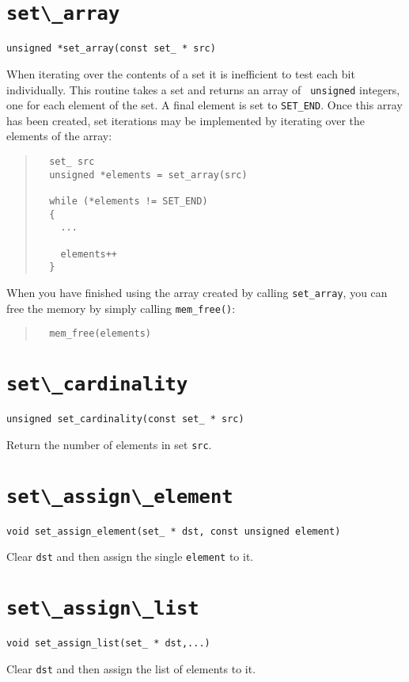 \section{\protect\verb+set\_array+}
\begin{verbatim}
unsigned *set_array(const set_ * src)
\end{verbatim}
When iterating over the contents of a set it is inefficient to test each
bit individually. This routine takes a set and returns an array of {\tt
unsigned} integers, one for each element of the set. A final element is
set to \verb+SET_END+. Once this array has been created, set iterations
may be implemented by iterating over the elements of the array:
\begin{quote}
\begin{verbatim}
  set_ src
  unsigned *elements = set_array(src)

  while (*elements != SET_END)
  {
    ...

    elements++
  }

\end{verbatim}
\end{quote}

When you have finished using the array created by calling
\verb+set_array+, you can free the memory by simply calling
\verb+mem_free()+:
\begin{quote}
\begin{verbatim}
  mem_free(elements)
\end{verbatim}
\end{quote}

\section{\protect\verb+set\_cardinality+}
\begin{verbatim}
unsigned set_cardinality(const set_ * src)
\end{verbatim}
Return the number of elements in set {\tt src}.

\section{\protect\verb+set\_assign\_element+}
\begin{verbatim}
void set_assign_element(set_ * dst, const unsigned element)
\end{verbatim}
Clear {\tt dst} and then assign the single {\tt element} to it.

\section{\protect\verb+set\_assign\_list+}
\begin{verbatim}
void set_assign_list(set_ * dst,...)
\end{verbatim}
Clear {\tt dst} and then assign the list of elements to it.

